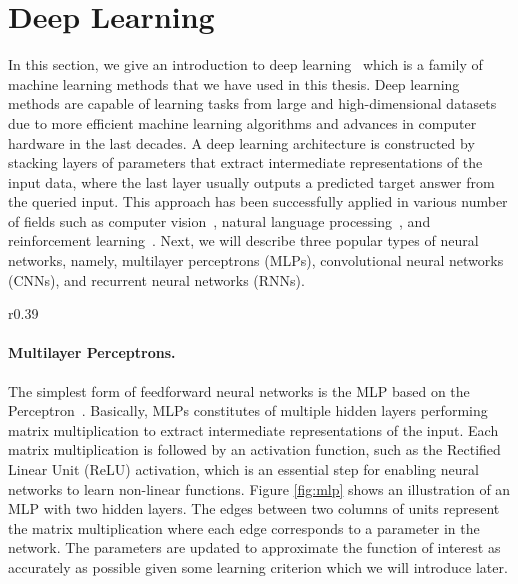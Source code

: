 \section{Deep Learning}\label{sec:deep_learning}

In this section, we give an introduction to deep learning~\cite{goodfellow2016deep} which is a family of machine learning methods that we have used in this thesis. 
Deep learning methods are capable of learning tasks from large and high-dimensional datasets due to more efficient machine learning algorithms and advances in computer hardware in the last decades. A deep learning architecture is constructed by stacking layers of parameters that extract intermediate representations of the input data, where the last layer usually outputs a predicted target answer from the queried input. This approach has been successfully applied in various number of fields such as computer vision~\cite{he2016deep, krizhevsky2012imagenet}, natural language processing~\cite{devlin2018bert}, and reinforcement learning~\cite{mnih2015human, silver2016mastering}. Next, we will describe three popular types of neural networks, namely, multilayer perceptrons (MLPs), convolutional neural networks (CNNs), and recurrent neural networks (RNNs).

\vspace{-3mm}
\begin{wrapfigure}{r}{0.39\textwidth}
	\centering
	\vspace{-3mm}
	\resizebox{0.39\textwidth}{!}{
		
	}
	\captionsetup{width=.9\linewidth}
	\caption{Illustration of MLP with two hidden layers.}
	\vspace{-3mm}
	\label{fig:mlp}
\end{wrapfigure}
\paragraph{Multilayer Perceptrons.} The simplest form of feedforward neural networks is the MLP based on the Perceptron~\cite{rosenblatt1958perceptron}. Basically, MLPs constitutes of multiple hidden layers performing matrix multiplication to extract intermediate representations of the input. Each matrix multiplication is followed by an activation function, such as the Rectified Linear Unit (ReLU) activation, which is an essential step for enabling neural networks to learn non-linear functions. Figure \ref{fig:mlp} shows an illustration of an MLP with two hidden layers. The edges between two columns of units represent the matrix multiplication where each edge corresponds to a parameter in the network. The parameters are updated to approximate the function of interest as accurately as possible given some learning criterion which we will introduce later.  



